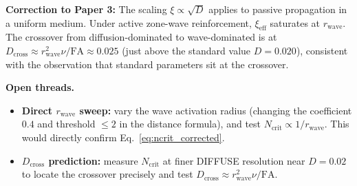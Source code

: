 \documentclass[11pt]{article}
\begin{document}
\noindent\textbf{Correction to Paper 3:} The scaling $\xi \propto \sqrt{D}$
applies to passive propagation in a uniform medium. Under active zone-wave
reinforcement, $\xi_{\mathrm{eff}}$ saturates at $r_{\mathrm{wave}}$.
The crossover from diffusion-dominated to wave-dominated is at
$D_{\mathrm{cross}} \approx r_{\mathrm{wave}}^2 \nu / \mathrm{FA} \approx 0.025$
(just above the standard value $D = 0.020$), consistent with the observation
that standard parameters sit at the crossover.

\bigskip
\noindent\textbf{Open threads.}
\begin{itemize}
  \item \textbf{Direct $r_{\mathrm{wave}}$ sweep:} vary the wave activation radius
    (changing the coefficient $0.4$ and threshold $\leq 2$ in the distance formula),
    and test $N_{\mathrm{crit}} \propto 1/r_{\mathrm{wave}}$.
    This would directly confirm Eq.~\eqref{eq:ncrit_corrected}.
  \item \textbf{$D_{\mathrm{cross}}$ prediction:} measure $N_{\mathrm{crit}}$ at
    finer DIFFUSE resolution near $D = 0.02$ to locate the crossover precisely
    and test $D_{\mathrm{cross}} \approx r_{\mathrm{wave}}^2 \nu / \mathrm{FA}$.
\end{itemize}
\end{document}
